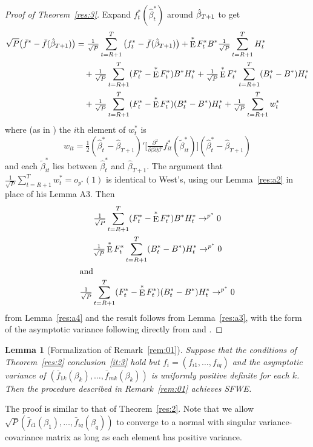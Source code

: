 \documentclass[12pt,fleqn]{article}
\newtheorem{lem}[thm]{Lemma}
\theoremstyle{definition}
\DeclareMathOperator{\E}{E}
\newcommand{\btrue}[1][]{\if#1*\hat\beta_{T+1}\else\beta_0\fi}
\newcommand{\osum}[1]{\sum_{#1=R+1}^T}
\newcommand{\oclt}[1]{\tfrac{1}{\sqrt{P}} \osum{#1}}
\newcommand{\sfwe}{SFWE}
\begin{document}
\newcommand{\WesA}[1][]{\oclt{t}
  (F_t^{#1} - \E^{#1} F_t^{#1}) B^{#1} H_t^{#1}}
\newcommand{\WesB}[1][]{\tfrac{1}{\sqrt{P}} \E^{#1} F_t^{#1} \osum{t} (B_t^{#1} -
  B^{#1}) H_t^{#1}}
\newcommand{\WesC}[1][]{\oclt{t}
  (F_t^{#1} - \E^{#1} F_t^{#1}) (B_t^{#1} - B^{#1}) H_t^{#1}}
\begin{proof}[Proof of Theorem~\ref{res:3}]
  Expand $f_t^{*}(\hat{\beta}_t^{*})$ around $\btrue[*]$
  to get
  \begin{align*}
    \sqrt{P} \big(\bar{f}^{*} - \bar{f}(\btrue[*])\big) &= \oclt{t}
    \big(f_t^{*} - \bar{f}(\btrue[*])\big) +
    \E^* F_t^{*} B^{*} \oclt{t} H_t^* \\
    & \quad + \WesA[*] + \WesB[*] \\ & \quad + \WesC[*] + \oclt{t} w_t^*
  \end{align*}
  where (as in \citealp{Wes:96}) the $i$th element of $w_t^*$ is
  \begin{equation*}
    w_{it} = \tfrac12 (\hat\beta_t^* - \hat\beta_{T+1})'
    \Big[\tfrac{\partial^2}{\partial \beta \partial\beta'} 
    f_{it}^*(\tilde\beta_{it}^*) \Big]
    (\hat\beta_t^* - \hat\beta_{T+1})
  \end{equation*}
  and each $\tilde\beta_{it}^*$ lies between $\hat\beta_t^*$ and
  $\hat\beta_{T+1}$.  The argument that $\oclt{t} w_t^* = o_{p^*}(1)$ is
  identical to West's, using our Lemma~\ref{res:a2} in place of his
  Lemma A3.  Then
  \begin{gather}
    \WesA[*] \to^{p^*} 0 \label{eq:7} \\
    \WesB[*] \to^{p^*} 0 \label{eq:9} \\
  \intertext{and}
    \WesC[*] \to^{p^*} 0 \label{eq:10}
  \end{gather}
  from Lemma~\ref{res:a4} and the result follows from
  Lemma~\ref{res:a3}, with the form of the asymptotic variance
  following directly from \citet{Wes:96} and \citet{WeM:98}.
\end{proof}

\begin{lem}[Formalization of Remark~\ref{rem:01}]
  Suppose that the conditions of Theorem~\ref{res:2} conclusion~\ref{it:3}
  hold but $f_i = (f_{i1},\dots,f_{iq})$ and the asymptotic variance
  of $(\bar{f}_{1k}(\beta_k),\dots,\bar{f}_{mk}(\beta_k))$ is
  uniformly positive definite for each $k$.  Then the procedure
  described in Remark~\ref{rem:01} achieves \sfwe.
\end{lem}

The proof is similar to that of Theorem~\ref{res:2}. Note that we
allow $\sqrt{P}(\bar{f}_{i1}(\beta_1),\dots,\bar{f}_{iq}(\beta_q))$ to
converge to a normal with singular variance-covariance matrix as long
as each element has positive variance.
\end{document}
